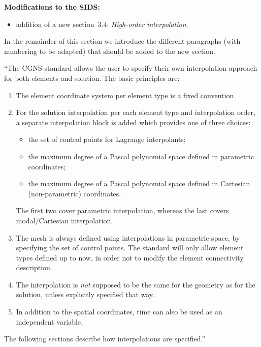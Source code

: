 \documentclass[11pt,letterpaper]{article}
\newenvironment{v2quote}
  {\begin{v2quoteframe}%
   \noindent{\footnotesize\sffamily\bfseries\color{cgnsblue}v2 text}%
   \nopagebreak\par\nopagebreak\vspace{0.15em}}
  {\end{v2quoteframe}}
\begin{document}
\begin{v2quote}
\textbf{Modifications to the SIDS:}
\begin{itemize}
  \item addition of a new section~3.4: \emph{High-order interpolation}.
\end{itemize}

In the remainder of this section we introduce the different paragraphs (with numbering to be
adapted) that should be added to the new section.
\end{v2quote}

\begin{v2quote}
``The CGNS standard allows the user to specify their own interpolation approach for both elements
and solution.  The basic principles are:
\begin{enumerate}
  \item The element coordinate system per element type is a fixed convention.
  \item For the solution interpolation per each element type and interpolation order, a separate
    interpolation block is added which provides one of three choices:
    \begin{itemize}
      \item the set of control points for Lagrange interpolants;
      \item the maximum degree of a Pascal polynomial space defined in parametric coordinates;
      \item the maximum degree of a Pascal polynomial space defined in Cartesian
        (non-parametric) coordinates.
    \end{itemize}
    The first two cover parametric interpolation, whereas the last covers
    modal/Cartesian interpolation.
  \item The mesh is always defined using interpolations in parametric space, by specifying the
    set of control points.  The standard will only allow element types defined up to now, in
    order not to modify the element connectivity description.
  \item The interpolation is \emph{not} supposed to be the same for the geometry as for the
    solution, unless explicitly specified that way.
  \item In addition to the spatial coordinates, time can also be used as an independent variable.
\end{enumerate}
The following sections describe how interpolations are specified.''
\end{v2quote}
\end{document}
